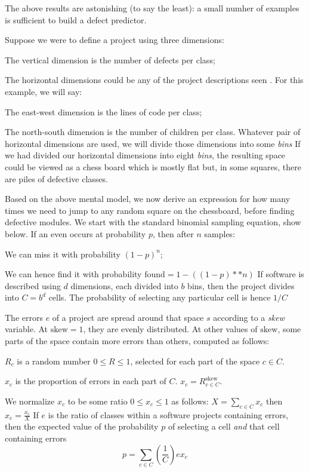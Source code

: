 



The above results are astonishing (to say the least): a small numher
of examples is sufficient to build a defect predictor.

Suppose we were to define a project using three dimensions:
\bi
\item The vertical dimension is the number of defects per class;
\item The horizontal dimensions could be any of the project descriptions seen . For this example, we will say:
  \bi
  \item The east-west dimension is the lines of code per class;
  \item The north-south dimension  is the number of children per class.
    \ei
    Whatever pair of horizontal dimensions are used, we will divide those dimensions into some {\em bins}
    \ei
    If we had  divided our horizontal dimensions into eight {\em bins}, the resulting space
    could be viewed as a chess board which is mostly flat but, in some squares, there
    are piles of defective classes.

    Based on the above mental model, we now derive an expression for how many times we need to jump to any random square on the chessboard,
    before finding defective modules. We start with the standard binomial sampling equation, show below. If an even occurs at probability $p$,
    then after $n$ samples:
    \bi
  \item
    We can miss it with probability $(1-p)^n$;
  \item
    We can hence find it with probability $\textrm{found}=1-((1-p)**n)$
    \ei
    If software is described using   $d$ dimensions, each divided into $b$ bins, then the 
    project divides into   $C=b^d$ cells.
    The probability of selecting any particular cell is hence $1/C$
    
    The  errors $e$ of a project are spread around that space $s$ according to a {\em skew} variable. At $\textrm{skew}=1$, they are evenly distributed.
    At other values of $\textrm{skew}$, some parts of the space contain more errors than others, computed as follows:
    \bi
  \item $R_c$ is a random number $0\le R \le 1$, selected for each part of the space $c\in C$.
  \item $x_c$ is the proportion of errors in each part of $C$. $x_c =  R_{c\in C}^\textrm{skew}$.
  \item We normalize $x_c$ to be some ratio $0 \le x_c \le 1$ as follows: $X= \sum_{c\in C} x_c$ then $x_c = \frac{x_c}{X}$
    \ei
    If  $e$ is the ratio of classes within a software projects containing errors, then 
    the expected value of the probability $p$ of selecting a cell {\em and} that cell containing errors
    \begin{equation}
      p = \sum_{c\in C}(\frac{1}{C})ex_c
    \end{equation}

